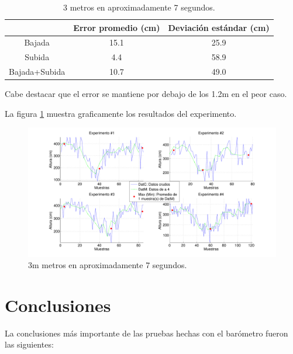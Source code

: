\documentclass[spanish,12pt,a4paper,titlepage]{report}
\begin{document}
\begin{table}[H]
\centering
\begin{tabular}{c|c|c|} 
\cline{2-3}
  & Error promedio (cm) & Deviación estándar (cm)\\ \hline
\multicolumn{1}{|c|}{Bajada} & 15.1 & 25.9 \\ \hline
\multicolumn{1}{|c|}{Subida} & 4.4 &  58.9 \\ \hline
\multicolumn{1}{|c|}{Bajada+Subida} & 10.7 & 49.0 \\ \hline
\end{tabular}
\caption{3 metros en aproximadamente 7 segundos.}
\label{tab:ruido-rms}
\end{table}

Cabe destacar que el error se mantiene por debajo de los 1.2m en el peor caso.

La figura \ref{fig:estante_veloz.pdf} muestra graficamente los resultados del experimento.

\begin{figure}[H]
\hspace{-90pt}
  \includegraphics[width=1.4\textwidth]{./pics/estante_veloz.pdf}
  \caption{3m metros en aproximadamente 7 segundos.}
  \label{fig:estante_veloz.pdf}
\end{figure}

\newpage
\section{Conclusiones}
\label{sec:conclusiones}

La conclusiones más importante de las pruebas hechas con el barómetro fueron las siguientes:
\end{document}

